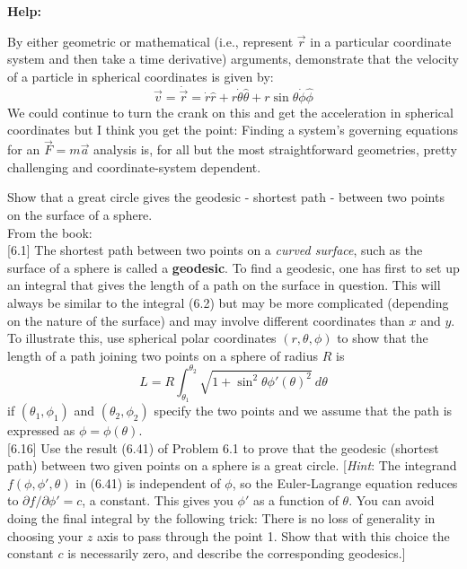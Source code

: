 \documentclass[11pt,letterpaper,boxed]{../hmcpset}
\begin{document}
\textbf{Help:}

\begin{problem}[i]
By either geometric or mathematical (i.e., represent $\vec r$ in a particular coordinate system and then take a time derivative) arguments, demonstrate that the velocity of a particle in spherical coordinates is given by: $$\vec v = \dot{\vec r} = \dot r \hat r + r \dot \theta \hat \theta + r \sin \theta \dot \phi \hat \phi $$
We could continue to turn the crank on this and get the acceleration in spherical coordinates but I think you get the point: Finding a system's governing equations for an $\vec F = m\vec a$ analysis is, for all but the most straightforward geometries, pretty challenging and coordinate-system dependent.
\end{problem}


\vfill
\begin{solution}




\end{solution}

\newpage

\begin{problem}[6.1 \& 6.16]
Show that a great circle gives the geodesic - shortest path - between two points on the surface of a sphere.\\
From the book:\\

[6.1] The shortest path between two points on a \textit{curved surface}, such as the surface of a sphere is called a \textbf{geodesic}. To find a geodesic, one has first to set up an integral that gives the length of a path on the surface in question. This will always be similar to the integral (6.2) but may be more complicated (depending on the nature of the surface) and may involve different coordinates than $x$ and $y$. To illustrate this, use spherical polar coordinates $(r, \theta, \phi)$ to show that the length of a path joining two points on a sphere of radius $R$ is
$$ L = R\int_{\theta_1}^{\theta_2} \sqrt{1 + \sin^2 \theta \phi' (\theta)^2} \ d \theta $$
if $(\theta_1,\phi_1)$ and $(\theta_2, \phi_2)$ specify the two points and we assume that the path is expressed as $\phi = \phi(\theta)$.\\

[6.16] Use the result (6.41) of Problem 6.1 to prove that the geodesic (shortest path) between two given points on a sphere is a great circle. [\textit{Hint}: The integrand $f(\phi, \phi',\theta)$ in (6.41) is independent of $\phi$, so the Euler-Lagrange equation reduces to $\partial f/\partial \phi' = c$, a constant. This gives you $\phi'$ as a function of $\theta$. You can avoid doing the final integral by the following trick: There is no loss of generality in choosing your $z$ axis to pass through the point 1. Show that with this choice the constant $c$ is necessarily zero, and describe the corresponding geodesics.]


\end{problem}
\begin{solution}


\vfill
\end{solution}
\end{document}
